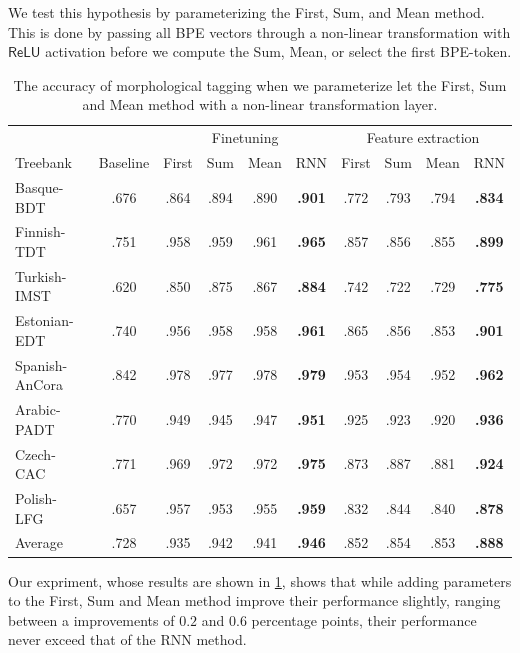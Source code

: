 \documentclass[11pt]{article}
\begin{document}
         We test this hypothesis by parameterizing the First, Sum, and Mean
     method.  This is done by passing all BPE vectors through a
     non-linear transformation with $\mathsf{ReLU}$ activation before
     we compute the Sum, Mean, or select the first BPE-token.
    


        \begin{table}%
	\centering
	\begin{tabular}{l|c|cccc|cccc}
		& & \multicolumn{4}{c}{Finetuning} & \multicolumn{4}{c}{Feature extraction} \\
		Treebank & Baseline & First & Sum & Mean & RNN & First & Sum & Mean & RNN \\
		\hline
		Basque-BDT      & .676 & .864 & .894 & .890 & \textbf{.901} & .772 & .793 & .794 & \textbf{.834} \\
		Finnish-TDT     & .751 & .958 & .959 & .961 & \textbf{.965} & .857 & .856 & .855 & \textbf{.899} \\
		Turkish-IMST    & .620 & .850 & .875 & .867 & \textbf{.884} & .742 & .722 & .729 & \textbf{.775} \\
		Estonian-EDT    & .740 & .956 & .958 & .958 & \textbf{.961} & .865 & .856 & .853 & \textbf{.901} \\
		Spanish-AnCora  & .842 & .978 & .977 & .978 & \textbf{.979} & .953 & .954 & .952 & \textbf{.962} \\
		Arabic-PADT     & .770 & .949 & .945 & .947 & \textbf{.951} & .925 & .923 & .920 & \textbf{.936} \\
		Czech-CAC       & .771 & .969 & .972 & .972 & \textbf{.975} & .873 & .887 & .881 & \textbf{.924} \\
		Polish-LFG      & .657 & .957 & .953 & .955 & \textbf{.959} & .832 & .844 & .840 & \textbf{.878} \\
        \hline
        Average         & .728 & .935 & .942 & .941 & \textbf{.946} & .852 & .854 & .853 & \textbf{.888} \\
	\end{tabular}
        	\caption{\label{tab:commutative-parameters} The accuracy
     of morphological tagging when we parameterize let the First, Sum and Mean method
     with a non-linear transformation layer.}
    \end{table}

                Our expriment, whose results are shown in \cref{tab:commutative-parameters},
     shows that while adding parameters to the First, Sum and Mean
     method improve their performance slightly, ranging between a
     improvements of $0.2$ and $0.6$ percentage points, their
     performance never exceed that of the RNN method.
\end{document}
